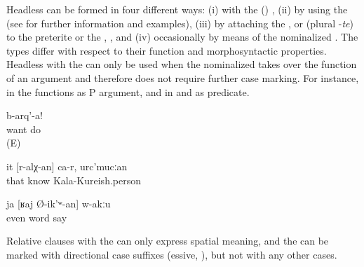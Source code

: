 Headless  can be formed in four different ways: (i) with the  () , (ii) by using the  (see  for further information and examples), (iii) by attaching the   ,  or  (plural -\textit{te}) to the preterite or the  , , and (iv) occasionally by means of the nominalized  . The types differ with respect to their function and morphosyntactic properties. Headless  with the  can only be used when the nominalized  takes over the function of an  argument and therefore does not require further case marking. For instance, in  the  functions as P argument, and in  and  as  predicate. 
%
\begin{exe}
	\ex	\label{ex:Do what you want}
	\gll	[at	b-ikː-an]	b-arq'-a!\\
			want	do\\
	\glt	{} (E)

	\ex	\label{ex:She is the one who I know, from Kala-Kureish}
	\gll	it	[r-alχ-an]	ca-r,	urc'mucːan\\
		that	know		Kala-Kureish.person\\
	\glt	{}

	\ex	\label{ex:There is even nobody who is talking.}
	\gll	ja	[ʁaj	Ø-ik'ʷ-an]	w-akːu\\
		even	word	say	\\
	\glt	{}
\end{exe}

Relative clauses with the  can only express spatial meaning, and the  can be marked with directional case suffixes (essive, ), but not with any other cases.

